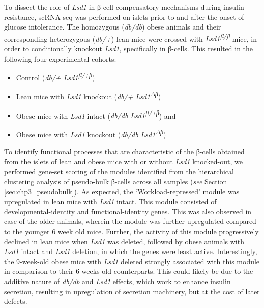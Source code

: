 
To dissect the role of \textit{Lsd1} in β-cell compensatory mechanisms during insulin resistance, scRNA-seq was performed on islets prior to and after the onset of glucose intolerance. The homozygous (\textit{db/db}) obese animals and their corresponding heterozygous (\textit{db/+}) lean mice were crossed with \textit{Lsd1\textsuperscript{fl/fl}} mice, in order to conditionally knockout \textit{Lsd1}, specifically in β-cells. This resulted in the following four experimental cohorts:
\begin{itemize}
    \item Control (\textit{db/+ Lsd1\textsuperscript{fl/+β}})
    \item Lean mice with \textit{Lsd1} knockout (\textit{db/+ Lsd1\textsuperscript{$\Delta$β}})
    \item Obese mice with \textit{Lsd1} intact (\textit{db/db Lsd1\textsuperscript{fl/+β}}) and
    \item Obese mice with \textit{Lsd1} knockout (\textit{db/db Lsd1\textsuperscript{$\Delta$β}})
\end{itemize}


To identify functional processes that are characteristic of the β-cells obtained from the islets of lean and obese mice with or without \textit{Lsd1} knocked-out, we performed gene-set scoring of the modules identified from the hierarchical clustering analysis of pseudo-bulk β-cells across all samples (\textit{see} Section \ref{sec:chp3_pseudobulk}). As expected, the `Workload-repressed' module was upregulated in lean mice with \textit{Lsd1} intact. This module consisted of developmental-identity and functional-identity genes. This was also observed in case of the older animals, wherein the module was further upregulated compared to the younger 6 week old mice. Further, the activity of this module progressively declined in lean mice when \textit{Lsd1} was deleted, followed by obese animals with \textit{Lsd1} intact and \textit{Lsd1} deletion, in which the genes were least active. Interestingly, the 9-week-old obese mice with \textit{Lsd1} deleted strongly associated with this module in-comparison to their 6-weeks old counterparts. This could likely be due to the additive nature of \textit{db/db} and \textit{Lsd1} effects, which work to enhance insulin secretion, resulting in upregulation of secretion machinery, but at the cost of later defects.